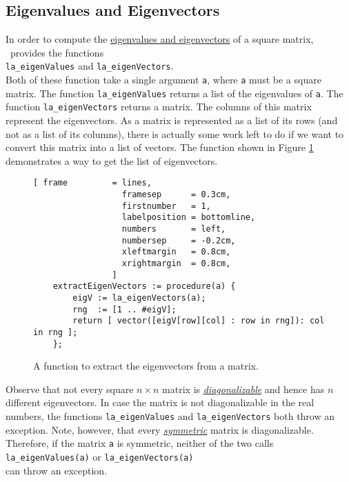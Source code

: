 \subsection{Eigenvalues and Eigenvectors}
In order to compute the 
\href{http://en.wikipedia.org/wiki/Eigenvalues_and_eigenvectors}{eigenvalues and eigenvectors} of a
square matrix, \setlx\ provides the functions
\\[0.2cm]
\hspace*{1.3cm}
\texttt{la\_eigenValues} \quad and \quad \texttt{la\_eigenVectors}.
\\[0.2cm]
Both of these function take a single argument \texttt{a}, where \texttt{a} must be a square matrix.
The function \texttt{la\_eigenValues} returns a list of the eigenvalues of \texttt{a}.  The
function \texttt{la\_eigenVectors} returns a matrix.  The columns of this matrix represent the
eigenvectors.  As a matrix is represented as a list of its rows (and not as a list of its columns),
there is actually some work left to do if we want to convert this matrix into a list of vectors.
The function shown in Figure \ref{fig:extract-eigenvectors.stlx} demonstrates a way to get the list of
eigenvectors. 

\begin{figure}[!ht]
\centering
\begin{Verbatim}[ frame         = lines, 
                  framesep      = 0.3cm, 
                  firstnumber   = 1,
                  labelposition = bottomline,
                  numbers       = left,
                  numbersep     = -0.2cm,
                  xleftmargin   = 0.8cm,
                  xrightmargin  = 0.8cm,
                ]
    extractEigenVectors := procedure(a) {
        eigV := la_eigenVectors(a);
        rng  := [1 .. #eigV];
        return [ vector([eigV[row][col] : row in rng]): col in rng ];
    };
\end{Verbatim}
\vspace*{-0.3cm}
\caption{A function to extract the eigenvectors from a matrix.}
\label{fig:extract-eigenvectors.stlx}
\end{figure}

Observe that not every square $n \times n$ matrix is 
\href{http://en.wikipedia.org/wiki/Diagonalizable_matrix}{\emph{diagonalizable}}
and hence has $n$ different eigenvectors.  In case the matrix is not diagonalizable in the real
numbers, the functions \texttt{la\_eigenValues} and \texttt{la\_eigenVectors} both throw an
exception.  Note, however, that every 
\href{http://en.wikipedia.org/wiki/Symmetric_matrix}{\emph{symmetric}} matrix is diagonalizable.
Therefore, if the matrix \texttt{a} is symmetric, neither of the two calls
\\[0.2cm]
\hspace*{1.3cm}
\texttt{la\_eigenValues(a)} \quad or \quad \texttt{la\_eigenVectors(a)}
\\[0.2cm]
can throw an exception.





